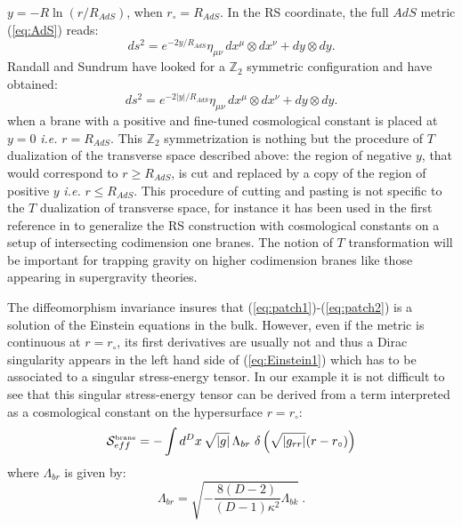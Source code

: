 \documentclass[a4paper,12pt]{article}
\def\action{{\cal S}}
\def\Rads{R_{\scriptscriptstyle AdS}}
\begin{document}
$y=- R \ln (r/\Rads)$, when $r_\circ=\Rads$. In the RS coordinate, the full
$AdS$ metric (\ref{eq:AdS}) reads:
%
\begin{equation}
	\label{RSAdS}
ds^2 = e^{-2 y/\Rads} \eta_{\mu\nu} \, dx^\mu \otimes dx^\nu
+ dy \otimes dy .
\end{equation}
%
Randall and Sundrum have looked for a $\mathbb{Z}_2$ symmetric configuration and have
obtained:
%
\begin{equation}
ds^2 = e^{-2 |y|/\Rads} \eta_{\mu\nu} \, dx^\mu \otimes dx^\nu
+ dy \otimes dy .
\end{equation}
%
when a brane with a positive and fine-tuned cosmological constant is placed at
$y=0$ {\it i.e.} $r=\Rads$. This  $\mathbb{Z}_2$ symmetrization is nothing
but the procedure of $T$ dualization of the transverse space described above:
the region of negative $y$, that would correspond to $r\geq \Rads$, is cut
and replaced by a copy of the region of positive $y$ {\it i.e.}
$r\leq \Rads$. This procedure of cutting and pasting is not specific to
the $T$ dualization of transverse space, for instance it has been used
in the first reference in \cite{intersections} to generalize the RS construction
with cosmological constants on a setup of intersecting codimension one
branes. The notion of $T$ transformation will be important for trapping gravity
on higher codimension branes like those appearing in supergravity theories.

The diffeomorphism invariance insures that (\ref{eq:patch1})-(\ref{eq:patch2})
is a solution of the Einstein equations in the bulk. However, even if the
metric is continuous at $r=r_\circ$, its first derivatives are usually not and thus
a Dirac singularity appears in the left hand side of (\ref{eq:Einstein1})
which has to be associated to a singular stress-energy tensor. In our example
it is not difficult to see that this singular stress-energy tensor can be derived
from a term interpreted as a cosmological constant on the hypersurface $r=r_\circ$:
%
\begin{equation}
	\label{eq:Lambdabr}
\action^{\mbox{\tiny brane}}_{eff}
= - \int d^{D} x\, \sqrt{|g|}\,
 \Lambda_{br}\
\delta \left(
\sqrt{|g_{rr}|}(r-r_\circ) \right)
\end{equation}
%
where $\Lambda_{br}$ is given by:
\begin{equation}
\Lambda_{br}
=\sqrt{-\frac{8(D-2)}{(D-1)\kappa^2} \Lambda_{bk}}
\ .
\end{equation}
%
\end{document}
